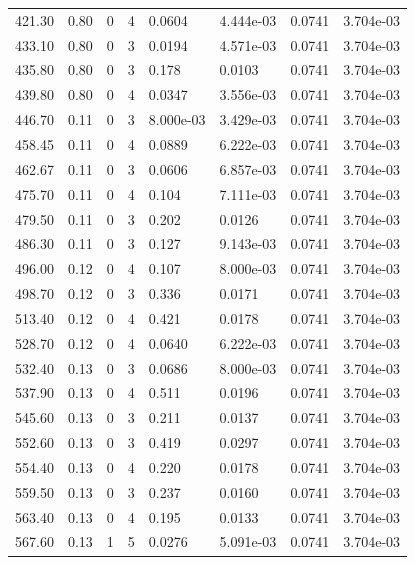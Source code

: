 \documentclass[preview]{standalone}
\begin{document}
{{{\begin{tabular}{L{1.2cm}C{1.2cm} C{0.3cm}C{0.5cm} C{1.4cm}C{1.4cm} C{1.4cm}C{1.4cm}}
  421.30  &  0.80  & 0     &  4 &  0.0604  & 4.444e-03  & 0.0741 &  3.704e-03   \\ 
  433.10  &  0.80  & 0     &  3 &  0.0194  & 4.571e-03  & 0.0741 &  3.704e-03   \\ 
  435.80  &  0.80  & 0     &  3 &  0.178  & 0.0103  & 0.0741 &  3.704e-03   \\ 
  439.80  &  0.80  & 0     &  4 &  0.0347  & 3.556e-03  & 0.0741 &  3.704e-03   \\ 
  446.70  &  0.11  & 0     &  3 &  8.000e-03  & 3.429e-03  & 0.0741 &  3.704e-03   \\ 
  458.45  &  0.11  & 0     &  4 &  0.0889  & 6.222e-03  & 0.0741 &  3.704e-03   \\ 
  462.67  &  0.11  & 0     &  3 &  0.0606  & 6.857e-03  & 0.0741 &  3.704e-03   \\ 
  475.70  &  0.11  & 0     &  4 &  0.104  & 7.111e-03  & 0.0741 &  3.704e-03   \\ 
  479.50  &  0.11  & 0     &  3 &  0.202  & 0.0126  & 0.0741 &  3.704e-03   \\ 
  486.30  &  0.11  & 0     &  3 &  0.127  & 9.143e-03  & 0.0741 &  3.704e-03   \\ 
  496.00  &  0.12  & 0     &  4 &  0.107  & 8.000e-03  & 0.0741 &  3.704e-03   \\ 
  498.70  &  0.12  & 0     &  3 &  0.336  & 0.0171  & 0.0741 &  3.704e-03   \\ 
  513.40  &  0.12  & 0     &  4 &  0.421  & 0.0178  & 0.0741 &  3.704e-03   \\ 
  528.70  &  0.12  & 0     &  4 &  0.0640  & 6.222e-03  & 0.0741 &  3.704e-03   \\ 
  532.40  &  0.13  & 0     &  3 &  0.0686  & 8.000e-03  & 0.0741 &  3.704e-03   \\ 
  537.90  &  0.13  & 0     &  4 &  0.511  & 0.0196  & 0.0741 &  3.704e-03   \\ 
  545.60  &  0.13  & 0     &  3 &  0.211  & 0.0137  & 0.0741 &  3.704e-03   \\ 
  552.60  &  0.13  & 0     &  3 &  0.419  & 0.0297  & 0.0741 &  3.704e-03   \\ 
  554.40  &  0.13  & 0     &  4 &  0.220  & 0.0178  & 0.0741 &  3.704e-03   \\ 
  559.50  &  0.13  & 0     &  3 &  0.237  & 0.0160  & 0.0741 &  3.704e-03   \\ 
  563.40  &  0.13  & 0     &  4 &  0.195  & 0.0133  & 0.0741 &  3.704e-03   \\ 
  567.60  &  0.13  & 1     &  5 &  0.0276  & 5.091e-03  & 0.0741 &  3.704e-03   \\ 

\end{tabular}}}}
\end{document}
